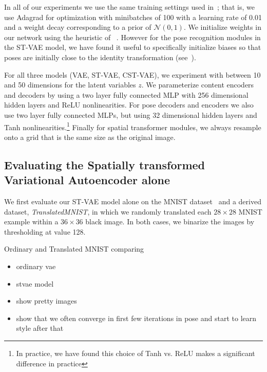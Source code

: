 
In all of our experiments we use the same training settings used in~\cite{Kingma2014}; that is,  
we use Adagrad for optimization with minibatches of 100  with a learning rate of 0.01
and a weight decay corresponding to a prior of $\mathcal{N}(0,1)$.
We initialize weights in our network using the heuristic of ~\cite{glorot2010understanding}.
However for the pose recognition modules in the ST-VAE model, we have found it useful to
specifically initialize biases so that poses are initially close to the identity transformation (see~\cite{jaderberg2015spatial}).

For all three models (VAE, ST-VAE, CST-VAE),
we experiment with between 10 and 50  dimensions for the latent variables $z$.
We parameterize content encoders and decoders
by using a two layer fully connected MLP with 256 dimensional
hidden layers and ReLU nonlinearities.
For pose decoders and encoders we also use two layer fully connected MLPs, but 
using 32 dimensional hidden layers and Tanh nonlinearities.\footnote{
In practice, we have found this choice of Tanh vs. ReLU makes a significant difference in practice}
Finally for spatial transformer modules, we always resample onto a grid that is the same size as the original
image.

\subsection{Evaluating the Spatially transformed Variational Autoencoder alone}

We first evaluate our ST-VAE model alone on the MNIST dataset~\citep{lecun1998gradient}
and a derived dataset, \emph{TranslatedMNIST}, in which we randomly translated each  $28\times 28$ MNIST example
within a $36\times 36$ black image.  In both cases, we binarize the images by thresholding at value 128.



Ordinary and Translated MNIST comparing
\begin{itemize}
\item ordinary vae
\item stvae model
\end{itemize}


\begin{itemize}
\item show pretty images
\item show that we often converge in first few iterations in pose and start to learn style after that
\end{itemize}



